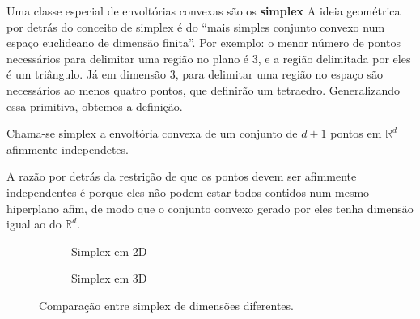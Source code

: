 Uma classe especial de envoltórias convexas são os \textbf{simplex}
A ideia geométrica por detrás do conceito de simplex é do ``mais simples
conjunto convexo num espaço euclideano de dimensão finita''. Por exemplo:
o menor número de pontos necessários para delimitar uma região no plano é
3, e a região delimitada por eles é um triângulo. Já em dimensão 3, para
delimitar uma região no espaço são necessários ao menos quatro pontos,
que definirão um tetraedro. Generalizando essa primitiva, obtemos a definição.

\begin{def:simplex}
	Chama-se simplex a envoltória convexa de um conjunto de $d+1$ pontos
	em $\mathbb{R}^d$ afimmente independetes.
\end{def:simplex}

A razão por detrás da restrição de que os pontos devem ser afimmente independentes
é porque eles não podem estar todos contidos num mesmo hiperplano afim, de modo
que o conjunto convexo gerado por eles tenha dimensão igual ao do $\mathbb{R}^d$.

\begin{figure}[h]
	\centering
	\begin{subfigure}{0.45\textwidth}
		\centering
		\caption{Simplex em 2D}
		\label{fig:triangulo}
	\end{subfigure}
	\hfill
	\begin{subfigure}{0.45\textwidth}
		\centering
		\caption{Simplex em 3D}
		\label{fig:tetraedro}
	\end{subfigure}
	\caption{Comparação entre simplex de dimensões diferentes.}
\end{figure}

